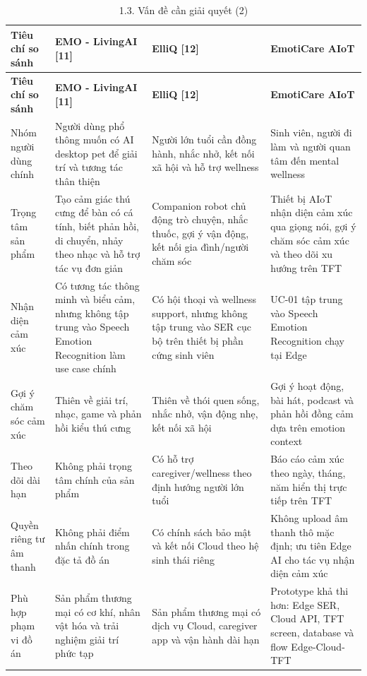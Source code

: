 \documentclass[12pt,a4paper]{article}
\begin{document}
\begin{center}
\scriptsize
\begin{longtable}{|P{0.18\textwidth}|P{0.25\textwidth}|P{0.25\textwidth}|P{0.22\textwidth}|}
\caption{1.3. Vấn đề cần giải quyết (2)}\\
\hline
\textbf{Tiêu chí so sánh} & \textbf{EMO - LivingAI [11]} & \textbf{ElliQ [12]} & \textbf{EmotiCare AIoT} \\
\hline
\endfirsthead
\hline
\textbf{Tiêu chí so sánh} & \textbf{EMO - LivingAI [11]} & \textbf{ElliQ [12]} & \textbf{EmotiCare AIoT} \\
\hline
\endhead
Nhóm người dùng chính & Người dùng phổ thông muốn có AI desktop pet để giải trí và tương tác thân thiện & Người lớn tuổi cần đồng hành, nhắc nhở, kết nối xã hội và hỗ trợ wellness & Sinh viên, người đi làm và người quan tâm đến mental wellness \\
\hline
Trọng tâm sản phẩm & Tạo cảm giác thú cưng để bàn có cá tính, biết phản hồi, di chuyển, nhảy theo nhạc và hỗ trợ tác vụ đơn giản & Companion robot chủ động trò chuyện, nhắc thuốc, gợi ý vận động, kết nối gia đình/người chăm sóc & Thiết bị AIoT nhận diện cảm xúc qua giọng nói, gợi ý chăm sóc cảm xúc và theo dõi xu hướng trên TFT \\
\hline
Nhận diện cảm xúc & Có tương tác thông minh và biểu cảm, nhưng không tập trung vào Speech Emotion Recognition làm use case chính & Có hội thoại và wellness support, nhưng không tập trung vào SER cục bộ trên thiết bị phần cứng sinh viên & UC-01 tập trung vào Speech Emotion Recognition chạy tại Edge \\
\hline
Gợi ý chăm sóc cảm xúc & Thiên về giải trí, nhạc, game và phản hồi kiểu thú cưng & Thiên về thói quen sống, nhắc nhở, vận động nhẹ, kết nối xã hội & Gợi ý hoạt động, bài hát, podcast và phản hồi đồng cảm dựa trên emotion context \\
\hline
Theo dõi dài hạn & Không phải trọng tâm chính của sản phẩm & Có hỗ trợ caregiver/wellness theo định hướng người lớn tuổi & Báo cáo cảm xúc theo ngày, tháng, năm hiển thị trực tiếp trên TFT \\
\hline
Quyền riêng tư âm thanh & Không phải điểm nhấn chính trong đặc tả đồ án & Có chính sách bảo mật và kết nối Cloud theo hệ sinh thái riêng & Không upload âm thanh thô mặc định; ưu tiên Edge AI cho tác vụ nhận diện cảm xúc \\
\hline
Phù hợp phạm vi đồ án & Sản phẩm thương mại có cơ khí, nhân vật hóa và trải nghiệm giải trí phức tạp & Sản phẩm thương mại có dịch vụ Cloud, caregiver app và vận hành dài hạn & Prototype khả thi hơn: Edge SER, Cloud API, TFT screen, database và flow Edge-Cloud-TFT \\
\hline
\end{longtable}
\normalsize
\end{center}
\end{document}
